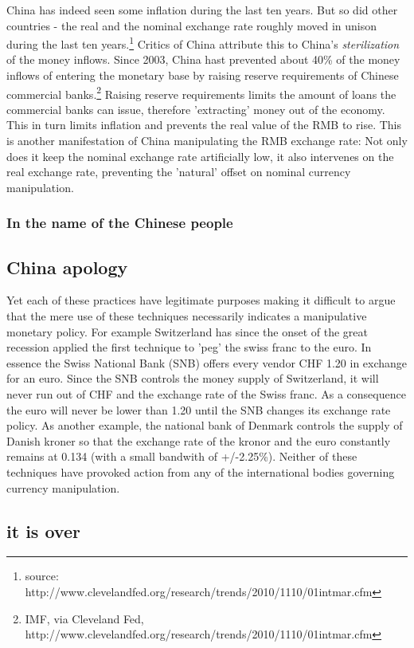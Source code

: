 \documentclass[11pt]{article}
\begin{document}
China has indeed seen some inflation during the last ten years. But so did other countries - the real and the nominal exchange rate roughly moved in unison during the last ten years.\footnote{source: http://www.clevelandfed.org/research/trends/2010/1110/01intmar.cfm}%
Critics of China attribute this to China's \emph{sterilization} of the money inflows. Since 2003, China hast prevented about 40\% of the money inflows of entering the monetary base by raising reserve requirements of Chinese commercial banks.\footnote{IMF, via Cleveland Fed, http://www.clevelandfed.org/research/trends/2010/1110/01intmar.cfm}%
Raising reserve requirements limits the amount of loans the commercial banks can issue, therefore 'extracting' money out of the economy. This in turn limits inflation and prevents the real value of the RMB to rise. This is another manifestation of China manipulating the RMB exchange rate: Not only does it keep the nominal exchange rate artificially low, it also intervenes on the real exchange rate, preventing the 'natural' offset on nominal currency manipulation.

\subsubsection{In the name of the Chinese people}



\subsection{China apology}

Yet each of these practices have legitimate purposes making it difficult 
to argue that the mere use of these techniques necessarily indicates a 
manipulative monetary policy. For example Switzerland has since the 
onset of the great recession applied the first technique to 'peg' the 
swiss franc to the euro. In essence the Swiss National Bank (SNB) offers 
every vendor CHF 1.20 in exchange for an euro. Since the SNB controls 
the money supply of Switzerland, it will never run out of CHF and the 
exchange rate of the Swiss franc. As a consequence the euro will never 
be lower than 1.20 until the SNB changes its exchange rate policy.  As 
another example, the national bank of Denmark controls the supply of 
Danish kroner so that the exchange rate of the kronor and the euro 
constantly remains at 0.134 (with a small bandwith of +/-2.25\%).  
Neither of these techniques have provoked action from any of the 
international bodies governing currency manipulation.


\subsection{it is over}
\end{document}
